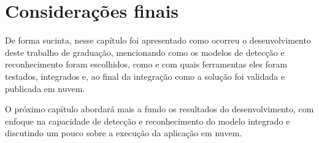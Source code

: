 \section{Considerações finais}
De forma sucinta, nesse capítulo foi apresentado como ocorreu o desenvolvimento deste trabalho de graduação, mencionando como os modelos de detecção e reconhecimento foram escolhidos, como e com quais ferramentas eles foram testados, integrados e, ao final da integração como a solução foi validada e publicada em nuvem.

O próximo capítulo abordará mais a fundo os resultados do desenvolvimento, com enfoque na capacidade de detecção e reconhecimento do modelo integrado e discutindo um pouco sobre a execução da aplicação em nuvem.
